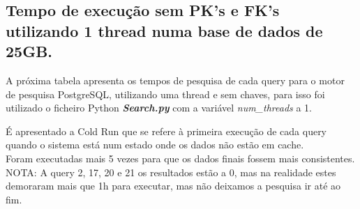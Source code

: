 \documentclass{article}
\begin{document}
\begin{table}[H]
    \centering
    \renewcommand{\arraystretch}{1.7}
    \caption{Tempo de criação das chaves estrangeiras em segundos para cada motor de pesquisa.(FK)}
    \label{tab:BC_Table3}
  \end{table}
\clearpage


\subsection{Tempo de execução sem PK's e FK's utilizando 1 thread numa base de dados de 25GB.}
\texttt{}\par A próxima tabela apresenta os tempos de pesquisa de cada query para o motor de pesquisa PostgreSQL, utilizando uma thread e sem chaves, para isso foi utilizado o ficheiro Python \textbf{\textit{Search.py}}  com a variável \textit{num\_threads} a 1. 
\texttt{}\par É apresentado a Cold Run que se refere à primeira execução de cada query quando o sistema está num estado onde os dados não estão em cache.\\
Foram executadas mais 5 vezes para que os dados finais fossem mais consistentes.\\
NOTA: A query 2, 17, 20 e 21 os resultados estão a 0, mas na realidade estes demoraram mais que 1h para executar, mas não deixamos a pesquisa ir até ao fim.
\end{document}
